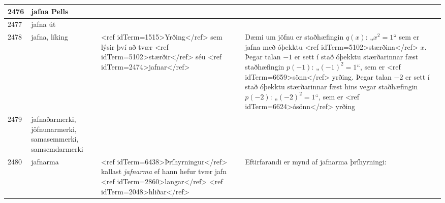 \begin{longtable}{p{}|p{}|p{}|p{}|p{}}
\hline
2476 & jafna Pells &  &  &  \\
\hline
2477 & jafna út &  &  &  \\
\hline
2478 & jafna, líking & <ref idTerm=1515>Yrðing</ref> sem lýsir því að tvær <ref idTerm=5102>stærðir</ref> séu <ref idTerm=2474>jafnar</ref> & Dæmi um jöfnu er staðhæfingin $q(x)$: „$x^2 = 1$“ sem er jafna með óþekktu <ref idTerm=5102>stærðina</ref> $x$. Þegar talan $-1$ er sett í stað óþekktu stærðarinnar fæst staðhæfingin $p(-1)$: „$(-1)^2 = 1$“, sem er <ref idTerm=6659>sönn</ref> yrðing. Þegar talan $-2$ er sett í stað óþekktu stærðarinnar fæst hins vegar staðhæfingin $p(-2)$: „$(-2)^2 = 1$“, sem er <ref idTerm=6624>ósönn</ref> yrðing &  \\
\hline
2479 & jafnaðarmerki, jöfnunarmerki, samasemmerki, samsemdarmerki &  &  &  \\
\hline
2480 & jafnarma & <ref idTerm=6438>Þríhyrningur</ref> kallast \textit{jafnarma} ef hann hefur tvær jafn <ref idTerm=2860>langar</ref> <ref idTerm=2048>hliðar</ref> & Eftirfarandi er mynd af jafnarma þríhyrningi:


\end{longtable}
